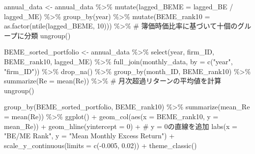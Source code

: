 \documentclass[
  letterpaper,
  DIV=11,
  numbers=noendperiod]{scrreprt}
\newenvironment{Shaded}{\begin{snugshade}}{\end{snugshade}}
\newcommand{\AttributeTok}[1]{\textcolor[rgb]{0.40,0.45,0.13}{#1}}
\newcommand{\CommentTok}[1]{\textcolor[rgb]{0.37,0.37,0.37}{#1}}
\newcommand{\DecValTok}[1]{\textcolor[rgb]{0.68,0.00,0.00}{#1}}
\newcommand{\FloatTok}[1]{\textcolor[rgb]{0.68,0.00,0.00}{#1}}
\newcommand{\FunctionTok}[1]{\textcolor[rgb]{0.28,0.35,0.67}{#1}}
\newcommand{\NormalTok}[1]{\textcolor[rgb]{0.00,0.23,0.31}{#1}}
\newcommand{\OtherTok}[1]{\textcolor[rgb]{0.00,0.23,0.31}{#1}}
\newcommand{\SpecialCharTok}[1]{\textcolor[rgb]{0.37,0.37,0.37}{#1}}
\newcommand{\StringTok}[1]{\textcolor[rgb]{0.13,0.47,0.30}{#1}}
\begin{document}
\begin{Shaded}
\begin{Highlighting}[]
\NormalTok{annual\_data }\OtherTok{\textless{}{-}}\NormalTok{ annual\_data }\SpecialCharTok{\%\textgreater{}\%} 
  \FunctionTok{mutate}\NormalTok{(}\AttributeTok{lagged\_BEME =}\NormalTok{ lagged\_BE }\SpecialCharTok{/}\NormalTok{ lagged\_ME) }\SpecialCharTok{\%\textgreater{}\%} 
  \FunctionTok{group\_by}\NormalTok{(year) }\SpecialCharTok{\%\textgreater{}\%} 
  \FunctionTok{mutate}\NormalTok{(}\AttributeTok{BEME\_rank10 =} \FunctionTok{as.factor}\NormalTok{(}\FunctionTok{ntile}\NormalTok{(lagged\_BEME, }\DecValTok{10}\NormalTok{))) }\SpecialCharTok{\%\textgreater{}\%} \CommentTok{\# 簿価時価比率に基づいて十個のグループに分類}
  \FunctionTok{ungroup}\NormalTok{()}
  
\NormalTok{BEME\_sorted\_portfolio }\OtherTok{\textless{}{-}}\NormalTok{ annual\_data }\SpecialCharTok{\%\textgreater{}\%}
  \FunctionTok{select}\NormalTok{(year, firm\_ID, BEME\_rank10, lagged\_ME) }\SpecialCharTok{\%\textgreater{}\%}
  \FunctionTok{full\_join}\NormalTok{(monthly\_data, }\AttributeTok{by =} \FunctionTok{c}\NormalTok{(}\StringTok{"year"}\NormalTok{, }\StringTok{"firm\_ID"}\NormalTok{)) }\SpecialCharTok{\%\textgreater{}\%}
  \FunctionTok{drop\_na}\NormalTok{() }\SpecialCharTok{\%\textgreater{}\%} 
  \FunctionTok{group\_by}\NormalTok{(month\_ID, BEME\_rank10) }\SpecialCharTok{\%\textgreater{}\%}
  \FunctionTok{summarize}\NormalTok{(}\AttributeTok{Re =} \FunctionTok{mean}\NormalTok{(Re)) }\SpecialCharTok{\%\textgreater{}\%} \CommentTok{\# 月次超過リターンの平均値を計算}
  \FunctionTok{ungroup}\NormalTok{()}

\FunctionTok{group\_by}\NormalTok{(BEME\_sorted\_portfolio, BEME\_rank10) }\SpecialCharTok{\%\textgreater{}\%}
  \FunctionTok{summarize}\NormalTok{(}\AttributeTok{mean\_Re =} \FunctionTok{mean}\NormalTok{(Re)) }\SpecialCharTok{\%\textgreater{}\%}
  \FunctionTok{ggplot}\NormalTok{() }\SpecialCharTok{+} 
  \FunctionTok{geom\_col}\NormalTok{(}\FunctionTok{aes}\NormalTok{(}\AttributeTok{x =}\NormalTok{ BEME\_rank10, }\AttributeTok{y =}\NormalTok{ mean\_Re)) }\SpecialCharTok{+} 
  \FunctionTok{geom\_hline}\NormalTok{(}\AttributeTok{yintercept =} \DecValTok{0}\NormalTok{) }\SpecialCharTok{+} \CommentTok{\# y = 0の直線を追加}
  \FunctionTok{labs}\NormalTok{(}\AttributeTok{x =} \StringTok{"BE/ME Rank"}\NormalTok{, }\AttributeTok{y =} \StringTok{"Mean Monthly Excess Return"}\NormalTok{) }\SpecialCharTok{+} 
  \FunctionTok{scale\_y\_continuous}\NormalTok{(}\AttributeTok{limits =} \FunctionTok{c}\NormalTok{(}\SpecialCharTok{{-}}\FloatTok{0.005}\NormalTok{, }\FloatTok{0.02}\NormalTok{)) }\SpecialCharTok{+} 
  \FunctionTok{theme\_classic}\NormalTok{()}
\end{Highlighting}
\end{Shaded}
\end{document}
